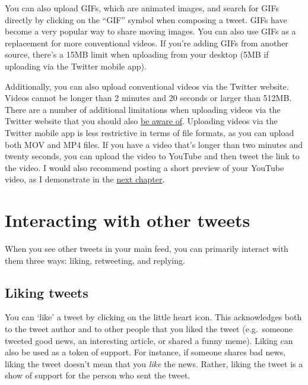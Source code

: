 \documentclass[
]{book}
\begin{document}
You can also upload GIFs, which are animated images, and search for GIFs directly by clicking on the ``GIF'' symbol when composing a tweet. GIFs have become a very popular way to share moving images. You can also use GIFs as a replacement for more conventional videos. If you're adding GIFs from another source, there's a 15MB limit when uploading from your desktop (5MB if uploading via the Twitter mobile app).

Additionally, you can also upload conventional videos via the Twitter website. Videos cannot be longer than 2 minutes and 20 seconds or larger than 512MB. There are a number of additional limitations when uploading videos via the Twitter website that you should also \href{https://help.twitter.com/en/using-twitter/twitter-videos}{be aware of}. Uploading videos via the Twitter mobile app is less restrictive in terms of file formats, as you can upload both MOV and MP4 files. If you have a video that's longer than two minutes and twenty seconds, you can upload the video to YouTube and then tweet the link to the video. I would also recommend posting a short preview of your YouTube video, as I demonstrate in the \protect\hyperlink{composing-tweets}{next chapter}.

\hypertarget{interacting-with-other-tweets}{%
\section*{Interacting with other tweets}\label{interacting-with-other-tweets}}

When you see other tweets in your main feed, you can primarily interact with them three ways: liking, retweeting, and replying.

\hypertarget{liking-tweets}{%
\subsection{Liking tweets}\label{liking-tweets}}

You can `like' a tweet by clicking on the little heart icon. This acknowledges both to the tweet author and to other people that you liked the tweet (e.g.~someone tweeted good news, an interesting article, or shared a funny meme). Liking can also be used as a token of support. For instance, if someone shares bad news, liking the tweet doesn't mean that you \emph{like} the news. Rather, liking the tweet is a show of support for the person who sent the tweet.
\end{document}
